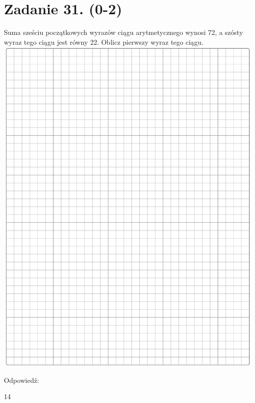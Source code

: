 \documentclass[10pt]{article}
\begin{document}
\section*{Zadanie 31. (0-2)}
Suma sześciu początkowych wyrazów ciągu arytmetycznego wynosi 72, a szósty wyraz tego ciągu jest równy 22. Oblicz pierwszy wyraz tego ciągu.\\
\includegraphics[max width=\textwidth, center]{2024_11_21_cdea326d19d0c2132b88g-14}

Odpowiedź:

14
\end{document}
